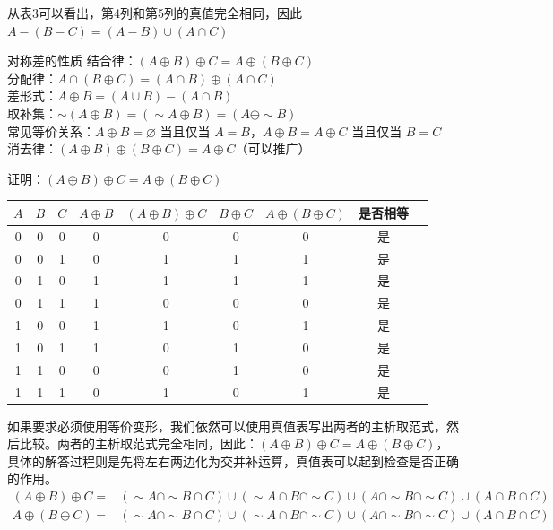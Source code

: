 \documentclass[lang=cn,11pt]{elegantbook}
\begin{document}
从表3可以看出，第4列和第5列的真值完全相同，因此$A - (B - C) = (A - B) \cup (A \cap C)$
\begin{theorem}{对称差的性质}
    结合律：$(A \oplus B) \oplus C = A \oplus (B \oplus C)$\\
    分配律：$A \cap (B \oplus C) = (A \cap B) \oplus (A \cap C)$\\
    差形式：$A \oplus B = (A \cup B) - (A \cap B)$\\
    取补集：$\sim(A \oplus B) = (\sim A \oplus B) = (A \oplus \sim B)$\\
    常见等价关系：$A \oplus B = \varnothing$ 当且仅当 $A = B$，$A \oplus B = A \oplus C$ 当且仅当 $B = C$\\
    消去律：$(A \oplus B) \oplus (B \oplus C) = A \oplus C$（可以推广）
\end{theorem}
证明：$(A \oplus B) \oplus C = A \oplus (B \oplus C)$
\begin{center}
\begin{tabular}{ccc|cccccc}
$A$ & $B$ & $C$ & $A \oplus B$ & $(A \oplus B) \oplus C$ & $B \oplus C$ & $A \oplus (B \oplus C)$ & 是否相等 \\
\hline
0 & 0 & 0 & 0 & 0 & 0 & 0 & 是 \\
0 & 0 & 1 & 0 & 1 & 1 & 1 & 是 \\
0 & 1 & 0 & 1 & 1 & 1 & 1 & 是 \\
0 & 1 & 1 & 1 & 0 & 0 & 0 & 是 \\
1 & 0 & 0 & 1 & 1 & 0 & 1 & 是 \\
1 & 0 & 1 & 1 & 0 & 1 & 0 & 是 \\
1 & 1 & 0 & 0 & 0 & 1 & 0 & 是 \\
1 & 1 & 1 & 0 & 1 & 0 & 1 & 是 \\
\end{tabular}
\end{center}
如果要求必须使用等价变形，我们依然可以使用真值表写出两者的主析取范式，然后比较。两者的主析取范式完全相同，因此：$(A \oplus B) \oplus C = A \oplus (B \oplus C)$，具体的解答过程则是先将左右两边化为交并补运算，真值表可以起到检查是否正确的作用。
\begin{align*}
(A \oplus B) \oplus C = & (\sim A \cap \sim B \cap C) \cup 
                        (\sim A \cap B \cap \sim C) \cup (A \cap \sim B \cap \sim C) \cup 
                        (A \cap B \cap C)\\
A \oplus (B \oplus C) = & (\sim A \cap \sim B \cap C) \cup 
                         (\sim A \cap B \cap \sim C) \cup 
                         (A \cap \sim B \cap \sim C) \cup 
                         (A \cap B \cap C)
\end{align*}
\end{document}
